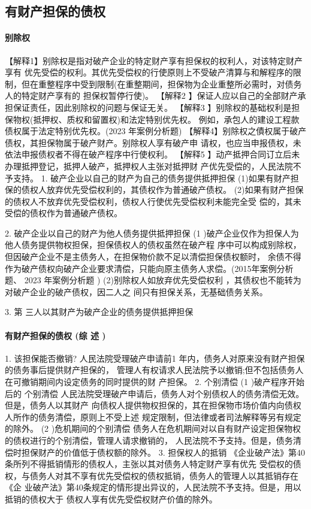 \documentclass[UTF8,12pt]{ctexart}
\numberwithin{equation}{section} %
\numberwithin{figure}{section}
\numberwithin{table}{section}
\begin{document}
	\subsection{有财产担保的债权}
	\paragraph{别除权}
	【解释1】别除权是指对破产企业的特定财产享有担保权的权利人，对该特定财产享有 优先受偿的权利。其优先受偿权的行使原则上不受破产清算与和解程序的限制，但在重整程序中受到限制(在重整期间，担保物为企业重整所必需时，对债务人的特定财产享有的 担保权暂停行使)。
	【解释2 】保证人应以自己的全部财产承担保证责任，因此别除权的问题与保证无关。 【解释3 】别除权的基础权利是担保物权(抵押权、质权和留置权)和法定特别优先权。 例如，承包人的建设工程款债权属于法定特别优先权。(2023 年案例分析题) 【解释4】别除权之債权属于破产债权，其担保物属于破产财产。别除权人享有破产申 请权，也应当申报债权，未依法申报债权者不得在破产程序中行使权利。
	【解释5 】动产抵押合同订立后未办理抵押登记，抵押人破产，抵押权人主张对抵押财 产优先受偿的，人民法院不予支持。
	1. 破产企业以自己的财产为自己的债务提供抵押担保 (1)如果有财产担保的债权人放弃优先受偿权利的，其债权作为普通破产债权。 (2)如果有财产担保的债权人不放弃优先受偿权利，债权人行使优先受偿权利未能完全受 偿的，其未受偿的债权作为普通破产债权。
	
	2. 破产企业以自己的财产为他人债务提供抵押担保
	(1 )破产企业仅作为担保人为他人债务提供物权担保，担保债权人的债权虽然在破产程 序中可以构成别除权，但因破产企业不是主债务人，在担保物价款不足以清偿担保债权额时， 余债不得作为破产债权向破产企业要求清偿，只能向原主债务人求偿。(2015年案例分析题、 2023 年案例分析题 )
	(2)别除权人如放弃优先受偿权利 ，其债权也不能转为对破产企业的破产债权，因二人之 间只有担保关系，无基础债务关系。
	
	3. 第 三人以其财产为破产企业的债务提供抵押担保
	
	\paragraph{有财产担保的债权 (综 述 )}
	1. 该担保能否撤销?
	人民法院受理破产申请前1 年内，债务人对原来没有财产担保的债务事后提供财产担保的， 管理人有权请求人民法院予以撤销;但不包括债务人在可撤销期间内设定债务的同时提供的财 产担保。
	2. 个别清偿
	(1 )破产程序开始后的 个别清偿
	人民法院受理破产申请后，债务人对个别债权人的债务清偿无效。但是，债务人以其财产 向债权人提供物权担保的，其在担保物市场价值内向债权人所作的债务清偿，原则上不受上述 规定限制，但法律或者司法解释等另有规定的除外。
	(2 )危机期间的个别清偿 债务人在危机期间对以自有财产设定担保物权的债权进行的个别清偿，管理人请求撤销的， 人民法院不予支持。但是，债务清偿时担保财产的价值低于债权额的除外。
	3. 担保权人的抵销
	《企业破产法》第40 条所列不得抵销情形的债权人，主张以其对债务人特定财产享有优先 受偿权的债权，与债务人对其不享有优先受偿权的债权抵销，债务人的管理人以其抵销存在《企 业破产法》第40条规定的情形提出异议的，人民法院不予支持。但是，用以抵销的债权大于 债权人享有优先受偿权财产价值的除外。
	
\end{document}
